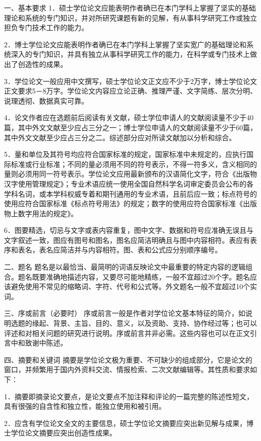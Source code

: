 一、基本要求
1．硕士学位论文应能表明作者确已在本门学科上掌握了坚实的基础理论和系统的专门知识，并对所研究课题有新的见解，有从事科学研究工作或独立担负专门技术工作的能力。

2．博士学位论文应能表明作者确已在本门学科上掌握了坚实宽广的基础理论和系统深入的专门知识，并具有独立从事科学研究工作的能力，在科学或专门技术上做出了创造性的成果。

3．学位论文一般应用中文撰写，硕士学位论文正文应不少于2万字，博士学位论文正文要求5－8万字。学位论文内容应立论正确、推理严谨、文字简练、层次分明、说理透彻、数据真实可靠。

4．论文作者应在选题前后阅读有关文献，硕士学位申请人的文献阅读量不少于40篇，其中外文文献至少应占三分之一；博士学位申请人的文献阅读量不少于60篇，其中外文文献至少应占三分之二。综述部分应对所读文献加以分析和综合。

5．量和单位及其符号均应符合国家标准的规定，国家标准中未规定的，应执行国际标准或行业标准；不同的量必须用不同的符号表示，不得一符多义，含义相同的量则必须用同一符号表示。学位论文应用最新颁布的汉语简化文字，符合《出版物汉字使用管理规定》；专业术语应统一使用全国自然科学名词审定委员会公布的各学科名词，或本学科权威专着和期刊通用的专业术语，且前后应一致；标点符号的使用应符合国家标准《标点符号用法》的规定；数字的使用应符合国家标准《出版物上数字用法的规定》。

6．图要精选，切忌与文字或表内容重复，图中文字、数据和符号应准确无误且与文字叙述一致，图应有图号和图名，图名应简洁明确且与图中内容相符。表应有表序和表名，表名应简洁并与内容相符。图、表和公式应分别顺序编号。

二、题名
题名是以最恰当、最简明的词语反映论文中最重要的特定内容的逻辑组合。题名既要准确地描述内容，又要尽可能地精练，一般不宜超过20个字。题名应该避免使用不常见的缩略词、字符、代号和公式等。外文题名一般不宜超过10个实词。

三、序或前言（必要时）
序或前言一般是作者对学位论文基本特征的简介，如说明选题的缘起、背景、主旨、目的、意义，以及资助、支持、协作经过等；也可以评述和对相关问题的研究进行说明。序或前言并非必需。这些内容也可以在正文引言中和致谢中陈述。

四、摘要和关键词
摘要是学位论文极为重要、不可缺少的组成部分，它是论文的窗口，并频繁用于国内外资料交流、情报检索、二次文献编辑等。其性质和要求如下：

1．摘要即摘录论文要点，是论文要点不加注释和评论的一篇完整的陈述性短文，具有很强的自含性和独立性，能独立使用和被引用。

2．应含有学位论文全文的主要信息，硕士学位论文摘要应突出新见解与成果，博士学位论文摘要应突出创造性成果。

